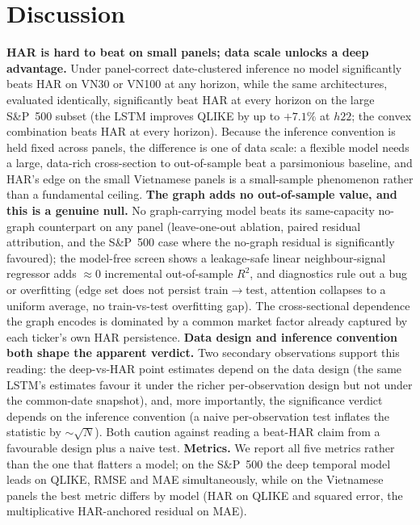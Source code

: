 \documentclass[runningheads]{llncs}
\begin{document}
\section{Discussion}\label{sec:disc}
\textbf{HAR is hard to beat on small panels; data scale unlocks a deep advantage.} Under panel-correct
date-clustered inference no model significantly beats HAR on VN30 or VN100 at any horizon, while the same
architectures, evaluated identically, significantly beat HAR at every horizon on the large S\&P~500 subset
(the LSTM improves QLIKE by up to $+7.1\%$ at $h22$; the convex combination beats HAR at every horizon).
Because the inference convention is held fixed across panels, the difference is one of data scale: a flexible
model needs a large, data-rich cross-section to out-of-sample beat a parsimonious baseline, and HAR's edge on
the small Vietnamese panels is a small-sample phenomenon rather than a fundamental ceiling.
\textbf{The graph adds no out-of-sample value, and this is a genuine null.} No graph-carrying model beats its
same-capacity no-graph counterpart on any panel (leave-one-out ablation, paired residual attribution, and the
S\&P~500 case where the no-graph residual is significantly favoured); the model-free screen shows a
leakage-safe linear neighbour-signal regressor adds $\approx0$ incremental out-of-sample $R^2$, and
diagnostics rule out a bug or overfitting (edge set does not persist train$\to$test, attention collapses to a
uniform average, no train-vs-test overfitting gap). The cross-sectional dependence the graph encodes is
dominated by a common market factor already captured by each ticker's own HAR persistence.
\textbf{Data design and inference convention both shape the apparent verdict.} Two secondary observations
support this reading: the deep-vs-HAR point estimates depend on the data design (the same LSTM's estimates
favour it under the richer per-observation design but not under the common-date snapshot), and, more
importantly, the significance verdict depends on the inference convention (a naive per-observation test
inflates the statistic by $\sim\sqrt{N}$). Both caution against reading a beat-HAR claim from a favourable
design plus a naive test. \textbf{Metrics.} We report all five metrics rather than the one that flatters a
model; on the S\&P~500 the deep temporal model leads on QLIKE, RMSE and MAE simultaneously, while on the
Vietnamese panels the best metric differs by model (HAR on QLIKE and squared error, the multiplicative
HAR-anchored residual on MAE).
\end{document}
